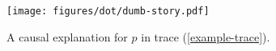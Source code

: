\begin{figure}[H]
  \vskip -0.8cm
  \begin{center}
    \texttt{[image: figures/dot/dumb-story.pdf]}
  \end{center}
  \vskip -1cm
  \caption{A causal explanation for $p$ in trace (\ref{example-trace}).}
  \label{fig:dumb-story}
\end{figure}
